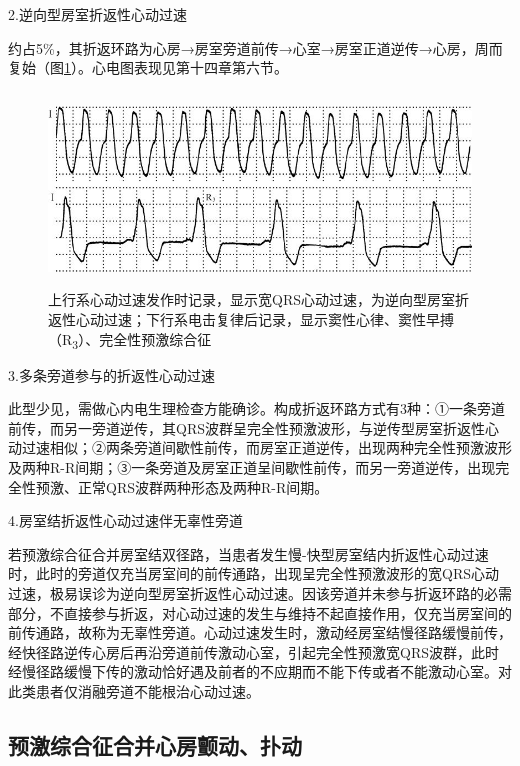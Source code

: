 2.逆向型房室折返性心动过速

约占5\%，其折返环路为心房→房室旁道前传→心室→房室正道逆传→心房，周而复始（图\ref{fig29-6}）。心电图表现见第十四章第六节。

\begin{figure}[!htbp]
 \centering
 \includegraphics[width=5.17708in,height=2.02083in]{./images/Image00490.jpg}
 \captionsetup{justification=centering}
 \caption{上行系心动过速发作时记录，显示宽QRS心动过速，为逆向型房室折返性心动过速；下行系电击复律后记录，显示窦性心律、窦性早搏（R\textsubscript{3}）、完全性预激综合征}
 \label{fig29-6}
  \end{figure} 


3.多条旁道参与的折返性心动过速

此型少见，需做心内电生理检查方能确诊。构成折返环路方式有3种：①一条旁道前传，而另一旁道逆传，其QRS波群呈完全性预激波形，与逆传型房室折返性心动过速相似；②两条旁道间歇性前传，而房室正道逆传，出现两种完全性预激波形及两种R-R间期；③一条旁道及房室正道呈间歇性前传，而另一旁道逆传，出现完全性预激、正常QRS波群两种形态及两种R-R间期。

4.房室结折返性心动过速伴无辜性旁道

若预激综合征合并房室结双径路，当患者发生慢-快型房室结内折返性心动过速时，此时的旁道仅充当房室间的前传通路，出现呈完全性预激波形的宽QRS心动过速，极易误诊为逆向型房室折返性心动过速。因该旁道并未参与折返环路的必需部分，不直接参与折返，对心动过速的发生与维持不起直接作用，仅充当房室间的前传通路，故称为无辜性旁道。心动过速发生时，激动经房室结慢径路缓慢前传，经快径路逆传心房后再沿旁道前传激动心室，引起完全性预激宽QRS波群，此时经慢径路缓慢下传的激动恰好遇及前者的不应期而不能下传或者不能激动心室。对此类患者仅消融旁道不能根治心动过速。

\protect\hypertarget{text00036.htmlux5cux23subid424}{}{}

\subsection{预激综合征合并心房颤动、扑动}

